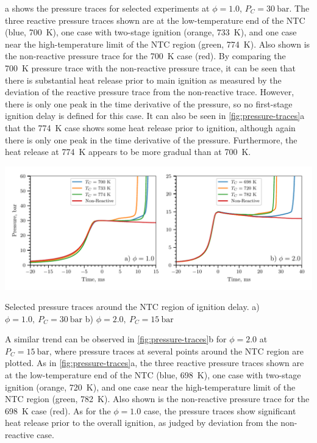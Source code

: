 \documentclass[letterpaper, review, sort&compress]{elsarticle}
\begin{document}
a shows the pressure traces for selected experiments at \(\phi=1.0\),
\(P_C =\SI[number-unit-product={\ }]{30}{\bar}\). The three reactive pressure traces shown are at
the low-temperature end of the NTC (blue, \SI{700}{\K}), one case with two-stage ignition (orange,
\SI{733}{\K}), and one case near the high-temperature limit of the NTC region (green, \SI{774}{\K}).
Also shown is the non-reactive pressure trace for the \SI{700}{\K} case (red). By comparing the
\SI{700}{\K} pressure trace with the non-reactive pressure trace, it can be seen that there is
substantial heat release prior to main ignition as measured by the deviation of the reactive
pressure trace from the non-reactive trace. However, there is only one peak in the time derivative
of the pressure, so no first-stage ignition delay is defined for this case. It can also be seen in
\cref{fig:pressure-traces}a that the \SI{774}{\K} case shows some heat release prior to ignition,
although again there is only one peak in the time derivative of the pressure. Furthermore, the heat
release at \SI{774}{\K} appears to be more gradual than at \SI{700}{\K}.

\begin{center}
    \captionsetup{type=figure}
    \includegraphics[width=\textwidth]{figures/pressure-traces.pdf}
    \caption{Selected pressure traces around the NTC region of ignition delay.
    a) \(\phi=1.0,\ P_C=\SI{30}{\bar}\) b) \(\phi=2.0,\ P_C=\SI{15}{\bar}\)}
    \label{fig:pressure-traces}
\end{center}

A similar trend can be observed in \cref{fig:pressure-traces}b for \(\phi=2.0\) at
\(P_C=\SI{15}{\bar}\), where pressure traces at several points around the NTC region are plotted. As
in \cref{fig:pressure-traces}a, the three reactive pressure traces shown are at the low-temperature
end of the NTC (blue, \SI{698}{\K}), one case with two-stage ignition (orange, \SI{720}{\K}), and
one case near the high-temperature limit of the NTC region (green, \SI{782}{\K}). Also shown is the
non-reactive pressure trace for the \SI{698}{\K} case (red). As for the \(\phi=1.0\) case, the
pressure traces show significant heat release prior to the overall ignition, as judged by deviation
from the non-reactive case.
\end{document}
